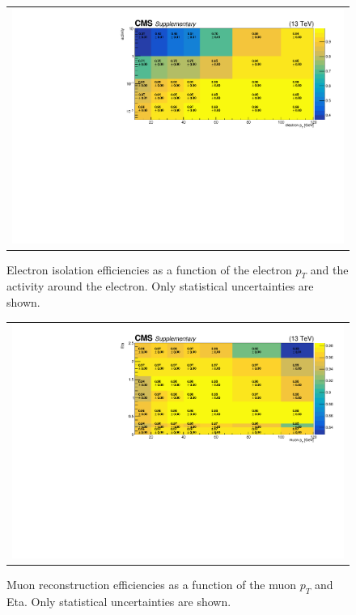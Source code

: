 \begin{figure}[hptb]
\begin{center}
\begin{tabular}{c}
\includegraphics[width=1.0\textwidth]{sections/mc4/Backgrounds/LostLepton/figures/v3_2d_effs_els_iso_no_baseline.pdf}
\end{tabular}
\end{center}
\caption{Electron isolation efficiencies as a function of the electron $p_T$ and the activity around the electron. Only statistical uncertainties are shown.}
\label{fig:eleeffiso}
\end{figure}

\begin{figure}[hptb]
\begin{center}
\begin{tabular}{c}
\includegraphics[width=1.0\textwidth]{sections/mc4/Backgrounds/LostLepton/figures/v3_2d_effs_mus_reco_no_baseline.pdf}
\end{tabular}
\end{center}
\caption{Muon reconstruction efficiencies as a function of the muon $p_T$ and Eta. Only statistical uncertainties are shown.}
\label{fig:muoneffreco}
\end{figure}

